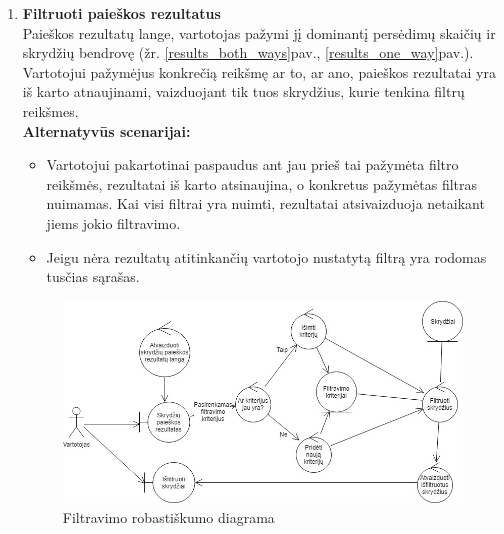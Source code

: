 \documentclass{VUMIFPSkursinis}
\begin{document}
\begin{enumerate}[label=\textbf{U\arabic*}.]
                    \item \textbf{Filtruoti paieškos rezultatus}\\
                    Paieškos rezultatų lange, vartotojas pažymi jį dominantį persėdimų skaičių ir skrydžių bendrovę (žr. \ref{results_both_ways}pav., \ref{results_one_way}pav.). Vartotojui pažymėjus konkrečią reikšmę ar to, ar ano, paieškos rezultatai yra iš karto atnaujinami, vaizduojant tik tuos skrydžius, kurie tenkina filtrų reikšmes.
                    \\\textbf{Alternatyvūs scenarijai:}
                    \begin{itemize}
                        \item Vartotojui pakartotinai paspaudus ant jau prieš tai pažymėta filtro reikšmės, rezultatai iš karto atsinaujina, o konkretus pažymėtas filtras nuimamas. Kai visi filtrai yra nuimti, rezultatai atsivaizduoja netaikant jiems jokio filtravimo.
                        \item Jeigu nėra rezultatų atitinkančių vartotojo nustatytą filtrą yra rodomas tusčias sąrašas.
                    \end{itemize}

                    \begin{figure}[H]
                        \centering
                        \includegraphics[scale=0.6]{img/ROBfilter}
                        \caption{Filtravimo robastiškumo diagrama}
                        \label{home_page_one_way}
                    \end{figure}


\end{enumerate}
\end{document}

